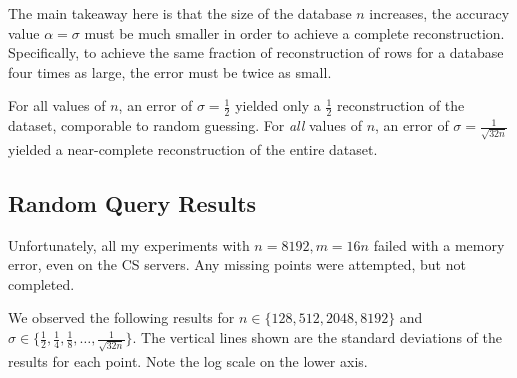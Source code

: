 The main takeaway here is that the size of the database $n$ increases, the accuracy value $\alpha=\sigma$ must be much
smaller in order to achieve a complete reconstruction.  Specifically, to achieve the same fraction of reconstruction of
rows for a database four times as large, the error must be twice as small.

For all values of $n$, an error of $\sigma=\frac12$ yielded only a $\frac12$ reconstruction of the dataset, comporable
to random guessing.  For \emph{all} values of $n$, an error of $\sigma=\frac{1}{\sqrt{32n}}$ yielded a near-complete reconstruction
of the entire dataset.

\subsection{Random Query Results}

Unfortunately, all my experiments with $n=8192, m=16n$ failed with a memory error, even on the CS servers.  Any missing
points were attempted, but not completed.

We observed the following results for $n \in \{128, 512, 2048, 8192\}$ and $\sigma \in \{\frac12, \frac14, \frac18,
\ldots, \frac{1}{\sqrt{32n}}\}$.  The vertical lines shown are the standard deviations of the results for each point.
Note the log scale on the lower axis.

